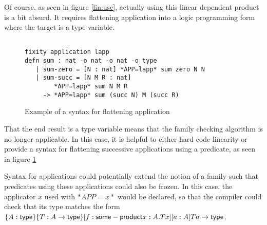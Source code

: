 Of course, as seen in figure \ref{lin:use}, actually using this linear dependent product is a bit
absurd.  It requires flattening application into a logic programming form where the target
is a type variable.


\begin{figure}[H]
\begin{lstlisting}

fixity application lapp
defn sum : nat -o nat -o nat -o type
   | sum-zero = [N : nat] *APP=lapp* sum zero N N
   | sum-succ = [N M R : nat] 
        *APP=lapp* sum N M R 
     -> *APP=lapp* sum (succ N) M (succ R)
\end{lstlisting}
\caption{Example of a syntax for flattening application}
\label{lin:flat}
\end{figure}


That the end result is a type variable means that the family checking algorithm
is no longer applicable. In this case, it is helpful to either hard code
linearity or provide a syntax for flattening successive applications using a predicate, as
seen in figure \ref{lin:flat}

Syntax for applications could potentially extend the notion of a family such that
predicates using these applications could also be frozen. In this case, the applicator $x$ used with 
$*APP = x*$ would be declared, so that the compiler could check that its type matches the form $\{ A : \mathsf{type} \}\{ T : A \rightarrow \mathsf{type} \}[f : \mathsf{some}-\mathsf{product} x : A . T x] [ a : A] T a \rightarrow \mathsf{type}$.
